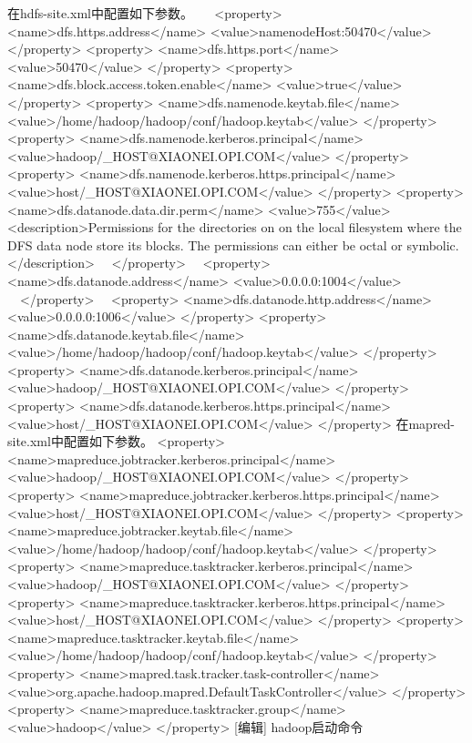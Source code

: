 \documentclass[a4paper,12pt]{article}
\begin{document}
在hdfs-site.xml中配置如下参数。
　
        <property>
         <name>dfs.https.address</name>
         <value>namenodeHost:50470</value>
        </property>
        <property>
         <name>dfs.https.port</name>
         <value>50470</value>
        </property>
        <property>
         <name>dfs.block.access.token.enable</name>
         <value>true</value>
        </property>
        <property>
         <name>dfs.namenode.keytab.file</name>
         <value>/home/hadoop/hadoop/conf/hadoop.keytab</value>
        </property>
        <property>
         <name>dfs.namenode.kerberos.principal</name>
         <value>hadoop/_HOST@XIAONEI.OPI.COM</value>
        </property>
        <property>
         <name>dfs.namenode.kerberos.https.principal</name>
         <value>host/_HOST@XIAONEI.OPI.COM</value>
        </property>
        <property>
          <name>dfs.datanode.data.dir.perm</name>
          <value>755</value>        
          <description>Permissions for the directories on on the local filesystem where
          the DFS data node store its blocks. The permissions can either be octal or
          symbolic.
          </description>
       　</property>
       　<property>
          <name>dfs.datanode.address</name>
          <value>0.0.0.0:1004</value>
       　</property>
       　<property>
          <name>dfs.datanode.http.address</name>
          <value>0.0.0.0:1006</value>
         </property>
         <property>
          <name>dfs.datanode.keytab.file</name>
          <value>/home/hadoop/hadoop/conf/hadoop.keytab</value> 
        </property>
        <property>
          <name>dfs.datanode.kerberos.principal</name>
          <value>hadoop/_HOST@XIAONEI.OPI.COM</value>
        </property>
        <property>
          <name>dfs.datanode.kerberos.https.principal</name>
          <value>host/_HOST@XIAONEI.OPI.COM</value>
        </property>
在mapred-site.xml中配置如下参数。
   <property>
     <name>mapreduce.jobtracker.kerberos.principal</name>
     <value>hadoop/_HOST@XIAONEI.OPI.COM</value>
   </property>
   <property>
     <name>mapreduce.jobtracker.kerberos.https.principal</name>
     <value>host/_HOST@XIAONEI.OPI.COM</value>
   </property>
   <property>
     <name>mapreduce.jobtracker.keytab.file</name>
     <value>/home/hadoop/hadoop/conf/hadoop.keytab</value>
   </property>
   <property>
     <name>mapreduce.tasktracker.kerberos.principal</name>
     <value>hadoop/_HOST@XIAONEI.OPI.COM</value>
   </property>
   <property>
     <name>mapreduce.tasktracker.kerberos.https.principal</name>
     <value>host/_HOST@XIAONEI.OPI.COM</value>
   </property>
   <property>
     <name>mapreduce.tasktracker.keytab.file</name>
     <value>/home/hadoop/hadoop/conf/hadoop.keytab</value>
   </property>
   <property>
     <name>mapred.task.tracker.task-controller</name>
     <value>org.apache.hadoop.mapred.DefaultTaskController</value>
   </property>
   <property>
     <name>mapreduce.tasktracker.group</name>
     <value>hadoop</value>
   </property>
[编辑] hadoop启动命令　
\end{document}
